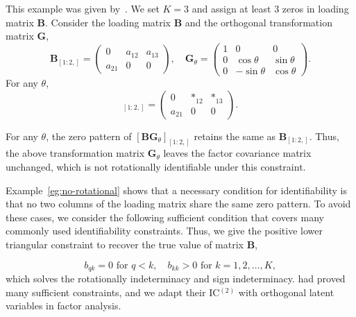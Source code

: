 \begin{example}
    This example was given by~\citet{Cui2026}. We set $K=3$ and assign at least 3 zeros in loading matrix $\mathbf{B}$. Consider the loading matrix $\mathbf{B}$ and the orthogonal transformation matrix $\mathbf{G}$,
    \begin{equation*}
        \mathbf{B}_{[1:2,]}=
        \begin{pmatrix}
            0 & a_{12} & a_{13} \\
            a_{21} & 0 & 0 
        \end{pmatrix}, \quad \mathbf{G}_{\theta}=
        \begin{pmatrix}
            1 & 0 & 0 \\
            0 & \cos \theta & \sin \theta \\
            0 & -\sin \theta & \cos \theta
        \end{pmatrix}.
    \end{equation*}
    For any $\theta$, 
    \begin{equation*}
        [\mathbf{B}\mathbf{G}_{\theta}]_{[1:2,]}
        =
        \begin{pmatrix}
            0 & *_{12} & *_{13} \\
            a_{21} & 0 & 0 
        \end{pmatrix}.
    \end{equation*}
    
    For any $\theta$, the zero pattern of $[\mathbf{B}\mathbf{G}_{\theta}]_{[1:2,]}$ retains the same as $\mathbf{B}_{[1:2,]}$. Thus, the above transformation matrix $\mathbf{G}_{\theta}$ leaves the factor covariance matrix unchanged, which is not rotationally identifiable under this constraint. 
    \label{eg:no-rotational}
\end{example}

Example~\eqref{eg:no-rotational} shows that a necessary condition for identifiability is that no two columns of the loading matrix share the same zero pattern. To avoid these cases, we consider the following sufficient condition that covers many commonly used identifiability constraints. Thus, we give the positive lower triangular constraint to recover the true value of matrix $\mathbf{B}$, 

\begin{equation}
    b_{qk}=0 \text{ for } q<k,\quad b_{kk}>0 \text{ for }k=1,2,\dots ,K,
    \label{eq: PLT}
\end{equation}
which solves the rotationally indeterminacy and sign indeterminacy. \citet{Cui2026} had proved many sufficient constraints, and we adapt their IC$^{(2)}$ with orthogonal latent variables in factor analysis.

